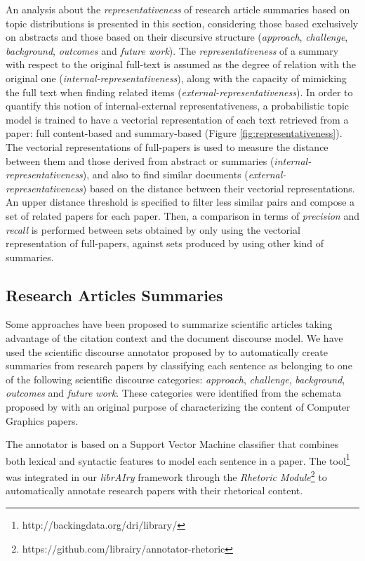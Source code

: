 An analysis about the \textit{representativeness} of research article summaries based on topic distributions is presented in this section, considering those based exclusively on abstracts and those based on their discursive structure (\textit{approach}, \textit{challenge}, \textit{background}, \textit{outcomes} and \textit{future work})\citep{SimoneTeufel2010}. The \textit{representativeness} of a summary with respect to the original full-text is assumed as the degree of relation with the original one (\textit{internal-representativeness}), along with the capacity of mimicking the full text when finding related items (\textit{external-representativeness}). In order to quantify this notion of internal-external representativeness, a probabilistic topic model is trained to have a vectorial representation of each text retrieved from a paper: full content-based and summary-based (Figure \ref{fig:representativeness}). The vectorial representations of full-papers is used to measure the distance between them and those derived from abstract or summaries (\textit{internal-representativeness}), and also to find similar documents (\textit{external- representativeness}) based on the distance between their vectorial representations. An upper distance threshold is specified to filter less similar pairs and compose a set of related papers for each paper. Then, a comparison in terms of \textit{precision} and \textit{recall} is performed between sets obtained by only using the vectorial representation of full-papers, against sets produced by using other kind of summaries.

\subsection{Research Articles Summaries}
\label{sec:annotator}
Some approaches have been proposed to summarize scientific articles \citep{Cohan2015} taking advantage of the citation context and the document discourse model. We have used the scientific discourse annotator proposed by \citep{Ronzano2015} to automatically create summaries from research papers by classifying each sentence as belonging to one of the following scientific discourse categories: \textit{approach}, \textit{challenge},  \textit{background}, \textit{outcomes} and \textit{future work}. These categories were identified from the schemata proposed by \citep{Teufel2009} with an original purpose of characterizing the content of Computer Graphics papers. 

The annotator is based on a Support Vector Machine classifier that combines both lexical and syntactic features to model each sentence in a paper. The tool\footnote{http://backingdata.org/dri/library/} was integrated in our \textit{librAIry} framework through the \textit{Rhetoric Module}\footnote{https://github.com/librairy/annotator-rhetoric} to automatically annotate research papers with their rhetorical content.

